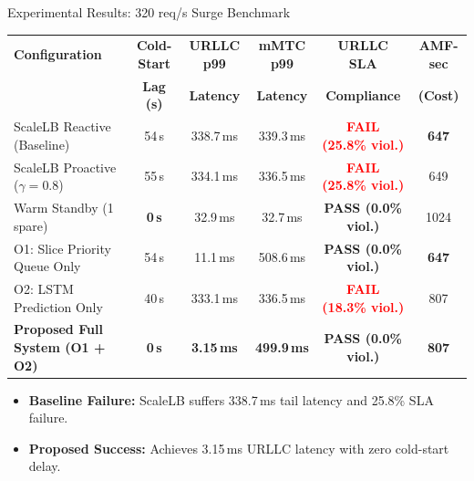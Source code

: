 \documentclass[aspectratio=169,11pt]{beamer}
\begin{document}
\begin{frame}{Experimental Results: 320 req/s Surge Benchmark}
  \centering
  \scriptsize
  \begin{tabular}{lccccc}
    \toprule
    \textbf{Configuration} & \textbf{Cold-Start} & \textbf{URLLC p99} & \textbf{mMTC p99} & \textbf{URLLC SLA} & \textbf{AMF-sec} \\
     & \textbf{Lag (s)} & \textbf{Latency} & \textbf{Latency} & \textbf{Compliance} & \textbf{(Cost)} \\
    \midrule
    ScaleLB Reactive (Baseline) & 54\,s & 338.7\,ms & 339.3\,ms & \textcolor{red}{\textbf{FAIL (25.8\% viol.)}} & \textbf{647} \\
    ScaleLB Proactive ($\gamma=0.8$) & 55\,s & 334.1\,ms & 336.5\,ms & \textcolor{red}{\textbf{FAIL (25.8\% viol.)}} & 649 \\
    Warm Standby (1 spare) & \textbf{0\,s} & 32.9\,ms & 32.7\,ms & \textcolor{urllcgreen}{\textbf{PASS (0.0\% viol.)}} & 1024 \\
    O1: Slice Priority Queue Only & 54\,s & 11.1\,ms & 508.6\,ms & \textcolor{urllcgreen}{\textbf{PASS (0.0\% viol.)}} & \textbf{647} \\
    O2: LSTM Prediction Only & 40\,s & 333.1\,ms & 336.5\,ms & \textcolor{red}{\textbf{FAIL (18.3\% viol.)}} & 807 \\
    \textbf{Proposed Full System (O1 + O2)} & \textbf{0\,s} & \textbf{3.15\,ms} & \textbf{499.9\,ms} & \textcolor{urllcgreen}{\textbf{PASS (0.0\% viol.)}} & \textbf{807} \\
    \bottomrule
  \end{tabular}
  \vspace{0.3cm}
  \normalsize
  \begin{itemize}
    \setlength\itemsep{0.4em}
    \item \textbf{Baseline Failure:} ScaleLB suffers 338.7\,ms tail latency and 25.8\% SLA failure.
    \item \textbf{Proposed Success:} Achieves 3.15\,ms URLLC latency with zero cold-start delay.
  \end{itemize}
\end{frame}
\end{document}
